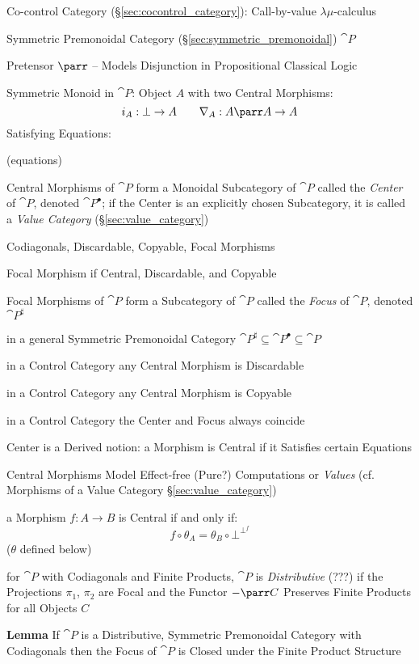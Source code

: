 Co-control Category (\S\ref{sec:cocontrol_category}): Call-by-value
$\lambda\mu$-calculus


\asterism


Symmetric Premonoidal Category (\S\ref{sec:symmetric_premonoidal})
$\cat{P}$

Pretensor $\parr$ -- Models Disjunction in Propositional Classical
Logic

Symmetric Monoid in $\cat{P}$: Object $A$ with two Central Morphisms:
\[
  i_A : \bot \rightarrow A \quad\quad
  \nabla_A : A \parr A \rightarrow A
\]
Satisfying Equations:

(equations) %

Central Morphisms of $\cat{P}$ form a Monoidal Subcategory of
$\cat{P}$ called the \emph{Center} of $\cat{P}$, denoted
$\cat{P}^\bullet$; if the Center is an explicitly chosen Subcategory,
it is called a \emph{Value Category} (\S\ref{sec:value_category})

Codiagonals, Discardable, Copyable, Focal Morphisms %

Focal Morphism if Central, Discardable, and Copyable

Focal Morphisms of $\cat{P}$ form a Subcategory of $\cat{P}$ called
the \emph{Focus} of $\cat{P}$, denoted $\cat{P}^\sharp$

in a general Symmetric Premonoidal Category $\cat{P}^\sharp \subseteq
\cat{P}^\bullet \subseteq \cat{P}$

in a Control Category any Central Morphism is Discardable

in a Control Category any Central Morphism is Copyable

in a Control Category the Center and Focus always coincide

Center is a Derived notion: a Morphism is Central if it Satisfies
certain Equations

Central Morphisms Model Effect-free (Pure?) Computations or
\emph{Values} (cf. Morphisms of a Value Category
\S\ref{sec:value_category})

a Morphism $f : A \rightarrow B$ is Central if and only if:
\[
  f \circ \theta_A = \theta_B \circ \bot^{\bot^f}
\]
($\theta$ defined below)

for $\cat{P}$ with Codiagonals and Finite Products, $\cat{P}$ is
\emph{Distributive} (???) if the Projections $\pi_1$, $\pi_2$ are
Focal and the Functor $-\parr C$ Preserves Finite Products for all
Objects $C$ %

\textbf{Lemma} If $\cat{P}$ is a Distributive, Symmetric Premonoidal
Category with Codiagonals then the Focus of $\cat{P}$ is Closed under
the Finite Product Structure

